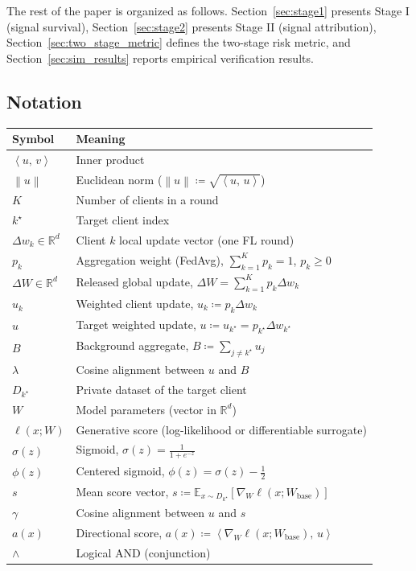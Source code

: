 \documentclass{article}
\theoremstyle{plain}
\theoremstyle{definition}
\theoremstyle{remark}
\numberwithin{theorem}{section}
\numberwithin{definition}{section}
\numberwithin{remark}{section}
\numberwithin{lemma}{section}
\numberwithin{assumption}{section}
\newcommand{\R}{\mathbb{R}}
\newcommand{\ip}[2]{\left\langle #1,\,#2 \right\rangle}
\newcommand{\norm}[1]{\left\lVert #1 \right\rVert}
\newcommand{\E}{\mathbb{E}}
\newcommand{\tindex}{k^\star}
\newcommand{\uk}[1]{u_{#1}}
\newcommand{\utarget}{u}
\newcommand{\ukstar}{\uk{\tindex}}
\newcommand{\pdelta}[1]{p_{#1}\Delta w_{#1}}
\begin{document}
The rest of the paper is organized as follows. Section~\ref{sec:stage1} presents Stage I (signal survival), Section~\ref{sec:stage2} presents Stage II (signal attribution),
Section~\ref{sec:two_stage_metric} defines the two-stage risk metric, and Section~\ref{sec:sim_results} reports empirical verification results.

\subsection{Notation}

\begin{center}
\begin{tabular}{@{}ll@{}}
\toprule
Symbol & Meaning \\
\midrule
$\ip{u}{v}$ & Inner product \\
$\norm{u}$ & Euclidean norm ($\norm{u} \coloneqq \sqrt{\ip{u}{u}}$) \\
$K$ & Number of clients in a round \\
$\tindex$ & Target client index \\
$\Delta w_k \in \R^d$ & Client $k$ local update vector (one FL round) \\
$p_k$ & Aggregation weight (FedAvg), $\sum_{k=1}^K p_k=1$, $p_k\ge0$ \\
$\Delta W \in \R^d$ & Released global update, $\Delta W=\sum_{k=1}^K \pdelta{k}$ \\
$\uk{k}$ & Weighted client update, $\uk{k} \coloneqq \pdelta{k}$ \\
$\utarget$ & Target weighted update, $\utarget \coloneqq \ukstar = \pdelta{\tindex}$ \\
$B$ & Background aggregate, $B\coloneqq \sum_{j\neq \tindex} \uk{j}$ \\
$\lambda$ & Cosine alignment between $\utarget$ and $B$ \\
$D_{\tindex}$ & Private dataset of the target client \\
$W$ & Model parameters (vector in $\R^d$) \\
$\ell(x;W)$ & Generative score (log-likelihood or differentiable surrogate) \\
$\sigma(z)$ & Sigmoid, $\sigma(z)=\frac{1}{1+e^{-z}}$ \\
$\phi(z)$ & Centered sigmoid, $\phi(z)=\sigma(z)-\tfrac12$ \\
$s$ & Mean score vector, $s\coloneqq \E_{x\sim D_{\tindex}}[\nabla_W \ell(x;W_{\mathrm{base}})]$ \\
$\gamma$ & Cosine alignment between $\utarget$ and $s$ \\
$a(x)$ & Directional score, $a(x)\coloneqq \ip{\nabla_W \ell(x;W_{\mathrm{base}})}{\utarget}$ \\
$\wedge$ & Logical AND (conjunction) \\
\bottomrule
\end{tabular}
\end{center}
\end{document}
